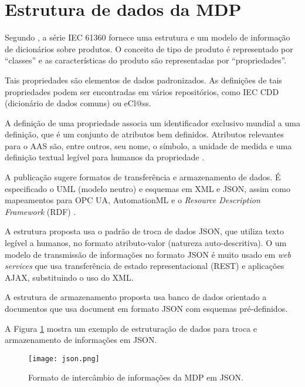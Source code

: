 	
	
	
	
\section{Estrutura de dados da MDP}

	Segundo , a série IEC 61360 fornece uma estrutura e um modelo de informação de dicionários sobre produtos. O conceito de tipo de produto é representado por ``classes'' e as características do produto são representadas por ``propriedades''.

	Tais propriedades são elementos de dados padronizados. As definições de tais propriedades podem ser encontradas em vários repositórios, como IEC CDD (dicionário de dados comuns) ou eCl@ss.
	
	A definição de uma propriedade associa um identificador exclusivo mundial a uma definição, que é um conjunto de atributos bem definidos. Atributos relevantes para o AAS são, entre outros, seu nome, o símbolo, a unidade de medida e uma definição textual legível para humanos da propriedade \cite{bader2019aas}.
	
	A publicação sugere formatos de transferência e armazenamento de dados. É especificado o UML (modelo neutro) e esquemas em XML e JSON, assim como mapeamentos para OPC UA, AutomationML e o \textit{Resource Description Framework} (RDF) \cite{plattform2019detailsaas}.
	
	A estrutura proposta usa o padrão de troca de dados JSON, que utiliza texto legível a humanos, no formato atributo-valor (natureza auto-descritiva). O um modelo de transmissão de informações no formato JSON é muito usado em \textit{web services} que usa transferência de estado representacional (REST) e aplicações AJAX, substituindo o uso do XML.
	
	A estrutura de armazenamento proposta usa banco de dados orientado a documentos que usa document em formato JSON com esquemas pré-definidos.
	
	A Figura \ref{fig:json} mostra um exemplo de estruturação de dados para troca e armazenamento de informações em JSON.
	
	\begin{figure}[hbt!]
		\centering
		\caption{Formato de intercâmbio de informações da MDP em JSON.}
		\texttt{[image: json.png]}
		\label{fig:json}
  \end{figure}
  

